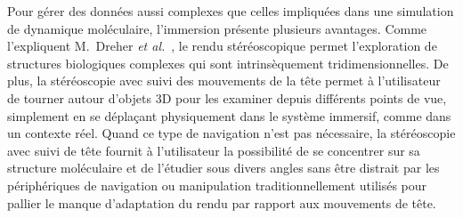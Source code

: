 	Pour gérer des données aussi complexes que celles impliquées dans une simulation de dynamique moléculaire, l'immersion présente plusieurs avantages. Comme l'expliquent M.~Dreher \emph{et al.}~\cite{dreher2014exaviz}, le rendu stéréoscopique\footnotemark{} permet l'exploration de structures biologiques complexes qui sont intrinsèquement tridimensionnelles. De plus, la stéréoscopie avec suivi des mouvements de la tête permet à l'utilisateur de tourner autour d'objets 3D pour les examiner depuis différents points de vue, simplement en se déplaçant physiquement dans le système immersif, comme dans un contexte réel. Quand ce type de navigation n'est pas nécessaire, la stéréoscopie avec suivi de tête fournit à l'utilisateur la possibilité de se concentrer sur sa structure moléculaire et de l'étudier sous divers angles sans être distrait par les périphériques de navigation ou manipulation traditionnellement utilisés pour pallier le manque d'adaptation du rendu par rapport aux mouvements de tête.
	
	
